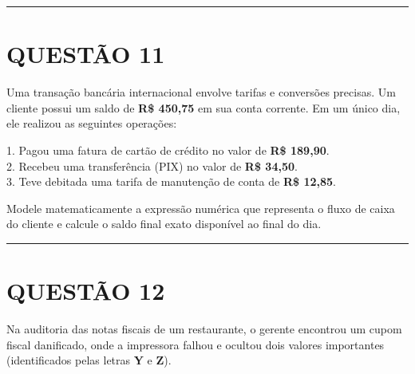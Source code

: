 \documentclass[12pt, a4paper]{article}
\begin{document}
\vspace{0.5cm} \noindent\rule{\textwidth}{0.4pt} \vspace{0.5cm}

\section*{QUESTÃO 11}

Uma transação bancária internacional envolve tarifas e conversões precisas. Um cliente possui um saldo de \textbf{R\$ 450,75} em sua conta corrente. Em um único dia, ele realizou as seguintes operações:

1. Pagou uma fatura de cartão de crédito no valor de \textbf{R\$ 189,90}.\\[0.3cm]
2. Recebeu uma transferência (PIX) no valor de \textbf{R\$ 34,50}.\\[0.3cm]
3. Teve debitada uma tarifa de manutenção de conta de \textbf{R\$ 12,85}.

Modele matematicamente a expressão numérica que representa o fluxo de caixa do cliente e calcule o saldo final exato disponível ao final do dia.

\vspace{0.5cm} \noindent\rule{\textwidth}{0.4pt} \vspace{0.5cm}

\section*{QUESTÃO 12}

Na auditoria das notas fiscais de um restaurante, o gerente encontrou um cupom fiscal danificado, onde a impressora falhou e ocultou dois valores importantes (identificados pelas letras \textbf{Y} e \textbf{Z}).
\end{document}
